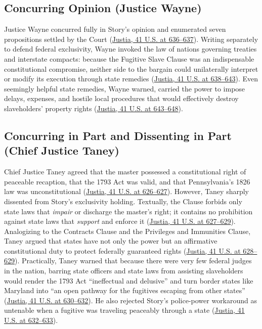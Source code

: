 \documentclass[12pt]{article}
\begin{document}
\subsection{Concurring Opinion (Justice Wayne)}
Justice Wayne concurred fully in Story's opinion and enumerated seven propositions settled by the Court (\href{https://supreme.justia.com/cases/federal/us/41/539/}{Justia, 41 U.S. at 636--637}). Writing separately to defend federal exclusivity, Wayne invoked the law of nations governing treaties and interstate compacts: because the Fugitive Slave Clause was an indispensable constitutional compromise, neither side to the bargain could unilaterally interpret or modify its execution through state remedies (\href{https://supreme.justia.com/cases/federal/us/41/539/}{Justia, 41 U.S. at 638--643}). Even seemingly helpful state remedies, Wayne warned, carried the power to impose delays, expenses, and hostile local procedures that would effectively destroy slaveholders' property rights (\href{https://supreme.justia.com/cases/federal/us/41/539/}{Justia, 41 U.S. at 643--648}).

\subsection{Concurring in Part and Dissenting in Part (Chief Justice Taney)}
Chief Justice Taney agreed that the master possessed a constitutional right of peaceable recaption, that the 1793 Act was valid, and that Pennsylvania's 1826 law was unconstitutional (\href{https://supreme.justia.com/cases/federal/us/41/539/}{Justia, 41 U.S. at 626--627}). However, Taney sharply dissented from Story's exclusivity holding. Textually, the Clause forbids only state laws that \textit{impair} or discharge the master's right; it contains no prohibition against state laws that \textit{support} and enforce it (\href{https://supreme.justia.com/cases/federal/us/41/539/}{Justia, 41 U.S. at 627--629}). Analogizing to the Contracts Clause and the Privileges and Immunities Clause, Taney argued that states have not only the power but an affirmative constitutional duty to protect federally guaranteed rights (\href{https://supreme.justia.com/cases/federal/us/41/539/}{Justia, 41 U.S. at 628--629}). Practically, Taney warned that because there were very few federal judges in the nation, barring state officers and state laws from assisting slaveholders would render the 1793 Act ``ineffectual and delusive'' and turn border states like Maryland into ``an open pathway for the fugitives escaping from other states'' (\href{https://supreme.justia.com/cases/federal/us/41/539/}{Justia, 41 U.S. at 630--632}). He also rejected Story's police-power workaround as untenable when a fugitive was traveling peaceably through a state (\href{https://supreme.justia.com/cases/federal/us/41/539/}{Justia, 41 U.S. at 632--633}).
\end{document}
